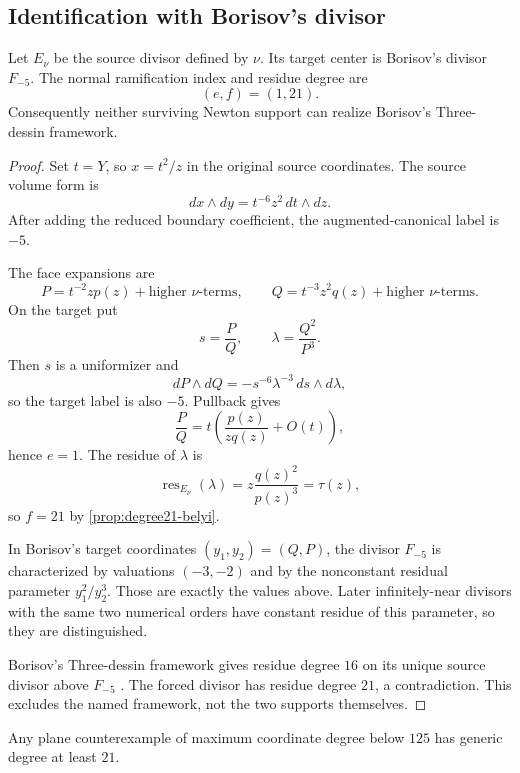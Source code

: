 \subsection{Identification with Borisov's divisor}

\begin{theorem}
\label{thm:borisov-fminusfive}
Let \(E_\nu\) be the source divisor defined by \(\nu\).  Its target center is
Borisov's divisor \(F_{-5}\).  The normal ramification index and residue
degree are
\[
(e,f)=(1,21).
\]
Consequently neither surviving Newton support can realize Borisov's
Three-dessin framework.
\end{theorem}

\begin{proof}
Set \(t=Y\), so \(x=t^2/z\) in the original source coordinates.  The source
volume form is
\[
dx\wedge dy=t^{-6}z^2\,dt\wedge dz.
\]
After adding the reduced boundary coefficient, the augmented-canonical label
is \(-5\).

The face expansions are
\[
P=t^{-2}zp(z)+\text{higher \(\nu\)-terms},\qquad
Q=t^{-3}z^2q(z)+\text{higher \(\nu\)-terms}.
\]
On the target put
\[
s=\frac P Q,\qquad \lambda=\frac{Q^2}{P^3}.
\]
Then \(s\) is a uniformizer and
\[
dP\wedge dQ=-s^{-6}\lambda^{-3}\,ds\wedge d\lambda,
\]
so the target label is also \(-5\).  Pullback gives
\[
\frac P Q
=t\left(\frac{p(z)}{zq(z)}+O(t)\right),
\]
hence \(e=1\).  The residue of \(\lambda\) is
\[
\operatorname{res}_{E_\nu}(\lambda)
=z\frac{q(z)^2}{p(z)^3}=\tau(z),
\]
so \(f=21\) by \cref{prop:degree21-belyi}.

In Borisov's target coordinates \((y_1,y_2)=(Q,P)\), the divisor
\(F_{-5}\) is characterized by valuations \((-3,-2)\) and by the
nonconstant residual parameter \(y_1^2/y_2^3\).  Those are exactly the
values above.  Later infinitely-near divisors with the same two numerical
orders have constant residue of this parameter, so they are distinguished.

Borisov's Three-dessin framework gives residue degree \(16\) on its unique
source divisor above \(F_{-5}\) \cite{borisov2020frameworks}.  The forced
divisor has residue degree
\(21\), a contradiction.  This excludes the named framework, not the two
supports themselves.
\end{proof}

\begin{corollary}
Any plane counterexample of maximum coordinate degree below \(125\) has
generic degree at least \(21\).
\end{corollary}

